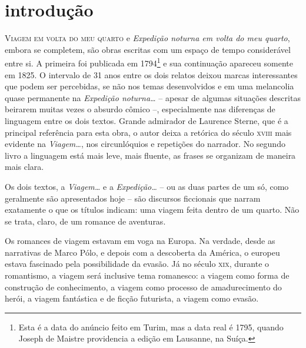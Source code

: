 \chapter[Introdução, por Sandra M. Stroparo]{introdução}
\vspace*{2ex}

\textsc{Viagem em volta do meu quarto} e \textit{Expedição noturna em
volta do meu quarto}, embora se completem, são obras escritas com um
espaço de tempo considerável entre si. A primeira foi publicada em
1794\footnote{ Esta é a data do anúncio feito em Turim, mas a data real
é 1795, quando Joseph de Maistre providencia a edição em Lausanne, na
Suíça.}  e sua continuação apareceu somente em 1825. O intervalo de 31
anos entre os dois relatos deixou marcas interessantes que podem ser
percebidas, se não nos temas desenvolvidos e em uma melancolia quase
permanente na \textit{Expedição noturna\ldots} -- apesar de algumas
situações descritas beirarem muitas vezes o absurdo cômico --,
especialmente nas diferenças de linguagem entre os dois textos. Grande
admirador de Laurence Sterne, que é a principal referência para esta
obra, o autor deixa a retórica do século \textsc{xviii} mais evidente na
\textit{Viagem\ldots}, nos circunlóquios e repetições do narrador. No
segundo livro a linguagem está mais leve, mais fluente, as frases se
organizam de maneira mais clara.

 Os dois textos, a \textit{Viagem\ldots} e a \textit{Expedição\ldots} -- ou as
duas partes de um só, como geralmente são apresentados hoje -- são
discursos ficcionais que narram exatamente o que os títulos indicam:
uma viagem feita dentro de um quarto. Não se trata, claro, de um
romance de aventuras. 

Os romances de viagem estavam em voga na Europa. Na verdade, desde as
narrativas de Marco Pólo, e depois com a descoberta da América, o
europeu estava fascinado pela possibilidade da evasão. Já no século
\textsc{xix}, durante o romantismo, a viagem será inclusive tema romanesco: a
viagem como forma de construção de conhecimento, a viagem como processo
de amadurecimento do herói, a viagem fantástica e de ficção futurista,
a viagem como evasão.


